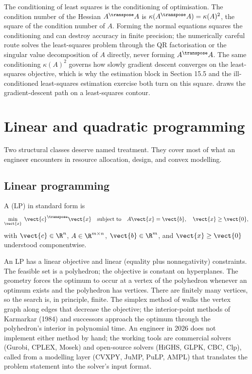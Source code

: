 The conditioning of least squares is the conditioning of
optimisation. The condition number of the Hessian $A^{\transpose}
A$ is $\kappa(A^{\transpose} A) = \kappa(A)^{2}$, the square of the
condition number of $A$. Forming the normal equations squares the
conditioning and can destroy accuracy in finite precision; the
numerically careful route solves the least-squares problem through
the QR factorisation or the singular value decomposition of $A$
directly, never forming $A^{\transpose} A$. The same conditioning
$\kappa(A)^{2}$ governs how slowly gradient descent converges on
the least-squares objective, which is why the estimation block in
Section 15.5 and the ill-conditioned least-squares estimation
exercise both turn on this square.
 draws the gradient-descent
path on a least-squares contour.



\section{Linear and quadratic programming}

Two structural classes deserve named treatment. They cover most
of what an engineer encounters in resource allocation, design,
and convex modelling.

\subsection{Linear programming}

\begin{definition}
A  (LP) in standard form is
\[
\min_{\vect{x}} \; \vect{c}^{\transpose} \vect{x}
\quad \text{subject to} \quad
A \vect{x} = \vect{b}, \quad \vect{x} \geq \vect{0},
\]
with $\vect{c} \in \R^{n}$, $A \in \R^{m \times n}$, $\vect{b}
\in \R^{m}$, and $\vect{x} \geq \vect{0}$ understood
componentwise.
\end{definition}

An LP has a linear objective and linear (equality plus
nonnegativity) constraints. The feasible set is a polyhedron;
the objective is constant on hyperplanes. The geometry forces
the optimum to occur at a vertex of the polyhedron whenever an
optimum exists and the polyhedron has vertices. There are
finitely many vertices, so the search is, in principle, finite.
The simplex method of \textcite{text:v2ch15-dantzig1947} walks the
vertex graph along edges that decrease the objective; the
interior-point methods of Karmarkar (1984) and successors approach
the optimum through the polyhedron's interior in polynomial time. An
engineer in 2026 does not implement either method by hand; the
working tools are commercial solvers (Gurobi, CPLEX, Mosek) and
open-source solvers (HiGHS, GLPK, CBC, Clp), called from a
modelling layer (CVXPY, JuMP, PuLP, AMPL) that translates the
problem statement into the solver's input format.

